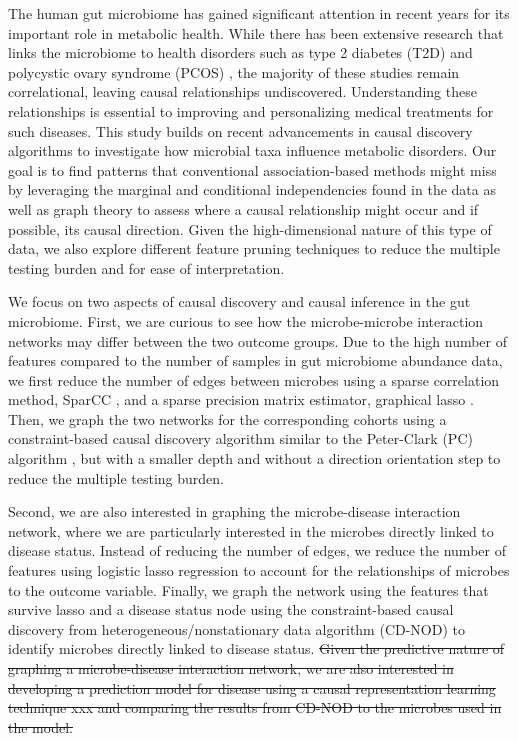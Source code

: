 \documentclass[12pt,letterpaper]{article}
\begin{document}
The human gut microbiome has gained significant attention in recent years for its important role in metabolic health. While there has been extensive research that links the microbiome to health disorders such as type 2 diabetes (T2D) \citep{zhou2019t2d} and polycystic ovary syndrome (PCOS) \citep{yang2024pcos}, the majority of these studies remain correlational, leaving causal relationships undiscovered. Understanding these relationships is essential to improving and personalizing medical treatments for such diseases.
This study builds on recent advancements in causal discovery algorithms to investigate how microbial taxa influence metabolic disorders. Our goal is to find patterns that conventional association-based methods might miss by leveraging the marginal and conditional independencies found in the data as well as graph theory to assess where a causal relationship might occur and if possible, its causal direction. Given the high-dimensional nature of this type of data, we also explore different feature pruning techniques to reduce the multiple testing burden and for ease of interpretation. 

We focus on two aspects of causal discovery and causal inference in the gut microbiome. First, we are curious to see how the microbe-microbe interaction networks may differ between the two outcome groups. Due to the high number of features compared to the number of samples in gut microbiome abundance data, we first reduce the number of edges between microbes using a sparse correlation method, SparCC \citep{weiss2016correlationbenchmark, friedman2012sparcc}, and a sparse precision matrix estimator, graphical lasso \citep{friedman2007glasso}. Then, we graph the two networks for the corresponding cohorts using a constraint-based causal discovery algorithm similar to the Peter-Clark (PC) algorithm \citep{glymour2019review}, but with a smaller depth and without a direction orientation step to reduce the multiple testing burden.

Second, we are also interested in graphing the microbe-disease interaction network, where we are particularly interested in the microbes directly linked to disease status. Instead of reducing the number of edges, we reduce the number of features using logistic lasso regression to account for the relationships of microbes to the outcome variable. Finally, we graph the network using the features that survive lasso and a disease status node using the constraint-based causal discovery from heterogeneous/nonstationary data algorithm (CD-NOD) \citep{huang2019cdnod} to identify microbes directly linked to disease status. \sout{Given the predictive nature of graphing a microbe-disease interaction network, we are also interested in developing a prediction model for disease using a causal representation learning technique xxx and comparing the results from CD-NOD to the microbes used in the model.} 
\end{document}
